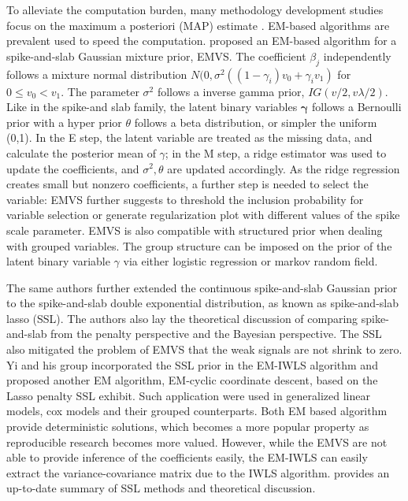 \documentclass[AMA,STIX1COL,]{WileyNJD-v2}
\begin{document}
To alleviate the computation burden, many methodology development
studies focus on the maximum a posteriori (MAP) estimate
\citep{Tipping2004}. EM-based algorithms are prevalent used to speed the
computation. \citet{Rockova2014a} proposed an EM-based algorithm for a
spike-and-slab Gaussian mixture prior, EMVS. The coefficient \(\beta_j\)
independently follows a mixture normal distribution
\(N(0, \sigma^2((1-\gamma_i)v_0 + \gamma_i v_1)\) for
\(0 \leq v_0 < v_1\). The parameter \(\sigma^2\) follows a inverse gamma
prior, \(IG(v/2, v\lambda /2)\). Like in the spike-and slab family, the
latent binary variables \(\boldsymbol{\gamma}\) follows a Bernoulli
prior with a hyper prior \(\theta\) follows a beta distribution, or
simpler the uniform (0,1). In the E step, the latent variable are
treated as the missing data, and calculate the posterior mean of
\(\gamma\); in the M step, a ridge estimator was used to update the
coefficients, and \(\sigma^2, \theta\) are updated accordingly. As the
ridge regression creates small but nonzero coefficients, a further step
is needed to select the variable: EMVS further suggests to threshold the
inclusion probability for variable selection or generate regularization
plot with different values of the spike scale parameter. EMVS is also
compatible with structured prior when dealing with grouped variables.
The group structure can be imposed on the prior of the latent binary
variable \(\gamma\) via either logistic regression or markov random
field.

The same authors \citep{Rockova2018b, Rockova2018} further extended the
continuous spike-and-slab Gaussian prior to the spike-and-slab double
exponential distribution, as known as spike-and-slab lasso (SSL). The
authors also lay the theoretical discussion of comparing spike-and-slab
from the penalty perspective and the Bayesian perspective. The SSL also
mitigated the problem of EMVS that the weak signals are not shrink to
zero. Yi and his group incorporated the SSL prior in the EM-IWLS
algorithm and proposed another EM algorithm, EM-cyclic coordinate
descent, based on the Lasso penalty SSL exhibit. Such application were
used in generalized linear models\citep{Tang2017a}, cox models
\citep{Tang2017} and their grouped
counterparts\citep{Tang2018, Tang2019}. Both EM based algorithm provide
deterministic solutions, which becomes a more popular property as
reproducible research becomes more valued. However, while the EMVS are
not able to provide inference of the coefficients easily, the EM-IWLS
can easily extract the variance-covariance matrix due to the IWLS
algorithm. \citet{Bai2020} provides an up-to-date summary of SSL methods
and theoretical discussion.
\end{document}
